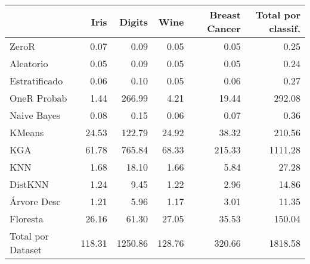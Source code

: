 \begin{table}
\centering
\label{runtime_table}
\begin{tabular}{lrrrrr}
\toprule
{} &   Iris &  Digits &   Wine &  Breast Cancer &  Total por classif. \\
\midrule
ZeroR             &   0.07 &    0.09 &   0.05 &           0.05 &                0.25 \\
Aleatorio         &   0.05 &    0.09 &   0.05 &           0.05 &                0.24 \\
Estratificado     &   0.06 &    0.10 &   0.05 &           0.06 &                0.27 \\
OneR Probab       &   1.44 &  266.99 &   4.21 &          19.44 &              292.08 \\
Naive Bayes       &   0.08 &    0.15 &   0.06 &           0.07 &                0.36 \\
KMeans            &  24.53 &  122.79 &  24.92 &          38.32 &              210.56 \\
KGA               &  61.78 &  765.84 &  68.33 &         215.33 &             1111.28 \\
KNN               &   1.68 &   18.10 &   1.66 &           5.84 &               27.28 \\
DistKNN           &   1.24 &    9.45 &   1.22 &           2.96 &               14.86 \\
Árvore Desc       &   1.21 &    5.96 &   1.17 &           3.01 &               11.35 \\
Floresta          &  26.16 &   61.30 &  27.05 &          35.53 &              150.04 \\
Total por Dataset & 118.31 & 1250.86 & 128.76 &         320.66 &             1818.58 \\
\bottomrule
\end{tabular}
\end{table}
